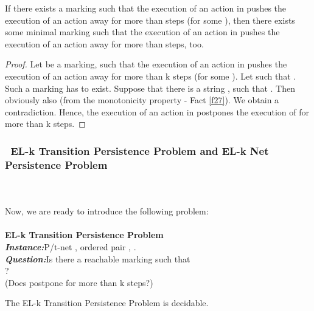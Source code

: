 \documentclass[a4paper]{llncs}
\begin{document}
\begin{proposition}
\label{p416}
If there exists a marking   such that the execution of an action  in  pushes the execution of an action  away for more than  steps (for some ), then there exists some minimal marking   such that the execution of an action  in  pushes the execution of an action  away for more than  steps, too.
\end{proposition}

\begin{proof}
Let  be a marking, such that the execution of an action  in  pushes the execution of an action  away for more than k steps (for some ). Let  such that . Such a marking has to exist. Suppose that there is a string ,  such that . Then obviously also  (from the monotonicity property - Fact \ref{f27}). We obtain a contradiction. Hence, the execution of an action  in  postpones the execution of  for more than k steps. 	
\end{proof}

\subsubsection{\textbullet \ EL-k Transition Persistence Problem and EL-k Net Persistence Problem}\mbox{ }\\
\\
Now, we are ready to introduce the following problem:
\\ \\
\textbf{EL-k Transition Persistence Problem}
\\
\indent\textbf{\emph{Instance:}}P/t-net , ordered pair , .\\
\indent\textbf{\emph{Question:}}Is there a reachable marking  such that  \\
\indent\indent \indent\indent?
\\
\indent\indent \indent\indent(Does  postpone  for more than k steps?)

\begin{theorem}
\label{t417}
The EL-k Transition Persistence Problem is decidable.
\end{theorem}
\end{document}
